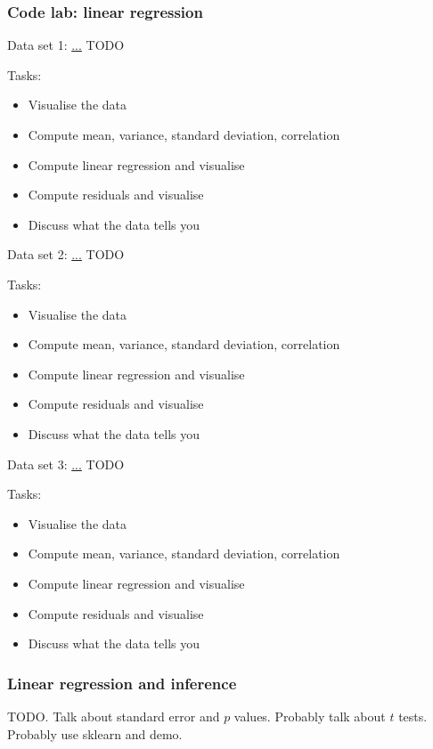 \documentclass[t]{beamer}
\begin{document}
\begin{frame}
  \frametitle{Code lab: linear regression}


   {
    Data set 1: \url{...} TODO

    Tasks:
    \begin{itemize}
    \item Visualise the data
    \item Compute mean, variance, standard deviation, correlation
    \item Compute linear regression and visualise
    \item Compute residuals and visualise
    \item Discuss what the data tells you
    \end{itemize}
  }

   {
    Data set 2: \url{...} TODO

    Tasks:
    \begin{itemize}
    \item Visualise the data
    \item Compute mean, variance, standard deviation, correlation
    \item Compute linear regression and visualise
    \item Compute residuals and visualise
    \item Discuss what the data tells you
    \end{itemize}
  }

   {
    Data set 3: \url{...} TODO

    Tasks:
    \begin{itemize}
    \item Visualise the data
    \item Compute mean, variance, standard deviation, correlation
    \item Compute linear regression and visualise
    \item Compute residuals and visualise
    \item Discuss what the data tells you
    \end{itemize}
  }

\end{frame}

\begin{frame}
  \frametitle{Linear regression and inference}

  TODO.  Talk about standard error and $p$ values.  Probably talk
  about $t$ tests.  Probably use sklearn and demo.
  
\end{frame}
\end{document}
